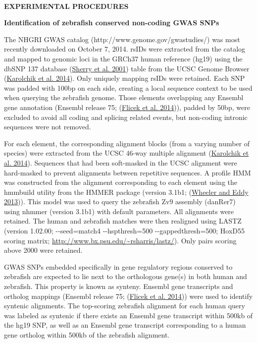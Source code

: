 \documentclass[]{article}
\begin{document}
\textbf{\\
}

\textbf{EXPERIMENTAL PROCEDURES}

\textbf{Identification of zebrafish conserved non-coding GWAS SNPs}

The NHGRI GWAS catalog (http://www.genome.gov/gwastudies/) was most
recently downloaded on October 7, 2014. rsIDs were extracted from the
catalog and mapped to genomic loci in the GRCh37 human reference (hg19)
using the dbSNP 137 database (\protect\hyperlink{_ENREF_27}{Sherry et
al. 2001}) table from the UCSC Genome Browser
(\protect\hyperlink{_ENREF_12}{Karolchik et al. 2014}). Only uniquely
mapping rsIDs were retained. Each SNP was padded with 100bp on each
side, creating a local sequence context to be used when querying the
zebrafish genome. Those elements overlapping any Ensembl gene annotation
(Ensembl release 75; (\protect\hyperlink{_ENREF_6}{Flicek et al.
2014})), padded by 50bp, were excluded to avoid all coding and splicing
related events, but non-coding intronic sequences were not removed.

For each element, the corresponding alignment blocks (from a varying
number of species) were extracted from the UCSC 46-way multiple
alignment (\protect\hyperlink{_ENREF_12}{Karolchik et al. 2014}).
Sequences that had been soft-masked in the UCSC alignment were
hard-masked to prevent alignments between repetitive sequences. A
profile HMM was constructed from the alignment corresponding to each
element using the hmmbuild utility from the HMMER package (version
3.1b1; (\protect\hyperlink{_ENREF_35}{Wheeler and Eddy 2013})). This
model was used to query the zebrafish Zv9 assembly (danRer7) using
nhmmer (version 3.1b1) with default parameters. All alignments were
retained. The human and zebrafish matches were then realigned using
LASTZ (version 1.02.00; -\/-seed=match4 -\/-hspthresh=500
-\/-gappedthresh=500; HoxD55 scoring matrix;
\url{http://www.bx.psu.edu/~rsharris/lastz/}). Only pairs scoring above
2000 were retained.

GWAS SNPs embedded specifically in gene regulatory regions conserved to
zebrafish are expected to lie next to the orthologous gene(s) in both
human and zebrafish. This property is known as synteny. Ensembl gene
transcripts and ortholog mappings (Ensembl release 75;
(\protect\hyperlink{_ENREF_6}{Flicek et al. 2014})) were used to
identify syntenic alignments. The top-scoring zebrafish alignment for
each human query was labeled as syntenic if there exists an Ensembl gene
transcript within 500kb of the hg19 SNP, as well as an Ensembl gene
transcript corresponding to a human gene ortholog within 500kb of the
zebrafish alignment.
\end{document}
